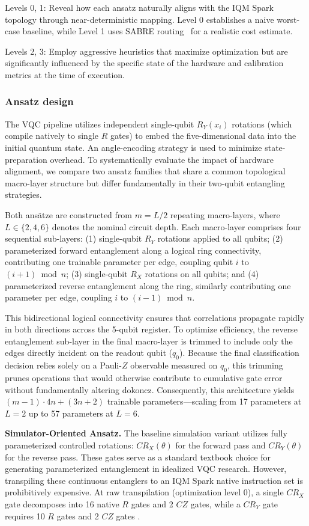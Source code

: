 \documentclass[11pt]{article}
\begin{document}
Levels 0, 1: Reveal how each ansatz naturally aligns with the IQM Spark topology through near-deterministic mapping. Level 0 establishes a naive worst-case baseline, while Level 1 uses SABRE routing~\cite{sabre2019} for a realistic cost estimate.

Levels 2, 3: Employ aggressive heuristics that maximize optimization but are significantly influenced by the specific state of the hardware and calibration metrics at the time of execution.

\subsubsection{Ansatz design}
The VQC pipeline utilizes independent single-qubit $R_Y(x_i)$ rotations (which compile natively to single $R$ gates) to embed the five-dimensional data into the initial quantum state. An angle-encoding strategy is used to minimize state-preparation overhead. To systematically evaluate the impact of hardware alignment, we compare two ansatz families that share a common topological macro-layer structure but differ fundamentally in their two-qubit entangling strategies.

Both ansätze are constructed from $m = L/2 $ repeating macro-layers, where $L \in \{2, 4, 6\}$ denotes the nominal circuit depth. Each macro-layer comprises four sequential sub-layers: 
(1) single-qubit $R_Y$ rotations applied to all qubits; 
(2) parameterized forward entanglement along a logical ring connectivity, contributing one trainable parameter per edge, coupling qubit $i$ to $(i+1) \bmod n$; 
(3) single-qubit $R_X$ rotations on all qubits; and 
(4) parameterized reverse entanglement along the ring, similarly contributing one parameter per edge, coupling $i$ to $(i-1) \bmod n$. 

This bidirectional logical connectivity ensures that correlations propagate rapidly in both directions across the 5-qubit register. To optimize efficiency, the reverse entanglement sub-layer in the final macro-layer is trimmed to include only the edges directly incident on the readout qubit ($q_0$). Because the final classification decision relies solely on a Pauli-$Z$ observable measured on $q_0$, this trimming prunes operations that would otherwise contribute to cumulative gate error without fundamentally altering {dokoncz}. Consequently, this architecture yields $(m-1) \cdot 4n + (3n+2)$ trainable parameters—scaling from 17 parameters at $L=2$ up to 57 parameters at $L=6$.

\textbf{Simulator-Oriented Ansatz.} The baseline simulation variant \cite{havlicek2019} utilizes fully parameterized controlled rotations: $CR_X(\theta)$ for the forward pass and $CR_Y(\theta)$ for the reverse pass. These gates serve as a standard textbook choice for generating parameterized entanglement in idealized VQC research. However, transpiling these continuous entanglers to an IQM Spark native instruction set is prohibitively expensive. At raw transpilation (optimization level 0), a single $CR_X$ gate decomposes into 16 native $R$ gates and 2 $CZ$ gates, while a $CR_Y$ gate requires 10 $R$ gates and 2 $CZ$ gates  \cite{qc1repo}.
\end{document}
